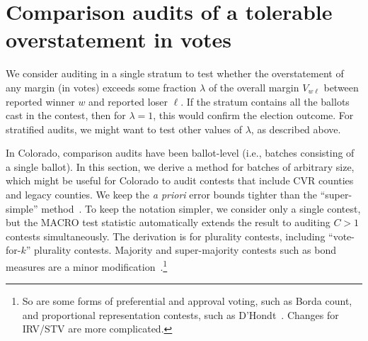 \section{Comparison audits of a tolerable overstatement in votes}
\label{sec:comparisonError}

We consider auditing in a single stratum to test whether the overstatement of any margin
(in votes) exceeds some fraction $\lambda$ of the overall margin $V_{w\ell}$ between
reported winner $w$ and reported loser $\ell$.
If the stratum contains all the ballots cast in the contest, then for $\lambda = 1$, this 
would confirm the election outcome.
For stratified audits, we might want to test other values of $\lambda$, as described above.

In Colorado, comparison audits have been ballot-level (i.e., batches consisting of a single
ballot). 
In this section, we derive a method for batches of arbitrary size, which might be useful
for Colorado to audit contests that include CVR counties and legacy counties.
We keep the \emph{a priori} error bounds tighter than the ``super-simple'' 
method~\citep{stark10d}.
To keep the notation simpler, we consider only a single contest, but the 
MACRO test statistic \citep{stark09c,stark10d} automatically extends the result to 
auditing $C>1$ contests simultaneously.
The derivation is for plurality contests, including ``vote-for-$k$'' plurality contests.
Majority and super-majority contests such as bond measures are a minor 
modification~\citep{stark08a}.\footnote{%
  So are some forms of preferential and approval voting, such as Borda count, and
  proportional representation contests, such as D'Hondt~\citep{starkTeague14}.
  Changes for IRV/STV are more complicated.
}

